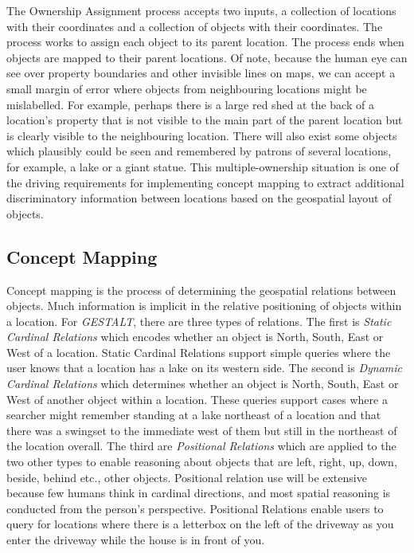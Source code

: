 The Ownership Assignment process accepts two inputs, a collection of locations with their coordinates and a collection of objects with their coordinates. 
The process works to assign each object to its parent location. 
The process ends when objects are mapped to their parent locations. Of note, because the human eye can see over property boundaries and other invisible lines on maps, we can accept a small margin of error where objects from neighbouring locations might be mislabelled. For example, perhaps there is a large red shed at the back of a location's property that is not visible to the main part of the parent location but is clearly visible to the neighbouring location.
There will also exist some objects which plausibly could be seen and remembered by patrons of several locations, for example, a lake or a giant statue. 
This multiple-ownership situation is one of the driving requirements for implementing concept mapping to extract additional discriminatory information between locations based on the geospatial layout of objects. 

\subsection{Concept Mapping}
Concept mapping is the process of determining the geospatial relations between objects. Much information is implicit in the relative positioning of objects within a location. For \textit{GESTALT}, there are three types of relations. 
The first is \textit{Static Cardinal Relations} which encodes whether an object is North, South, East or West of a location. Static Cardinal Relations support simple queries where the user knows that a location has a lake on its western side. 
The second is \textit{Dynamic Cardinal Relations} which determines whether an object is North, South, East or West of another object within a location. These queries support cases where a searcher might remember standing at a lake northeast of a location and that there was a swingset to the immediate west of them but still in the northeast of the location overall. 
The third are \textit{Positional Relations} which are applied to the two other types to enable reasoning about objects that are left, right, up, down, beside, behind etc., other objects. 
Positional relation use will be extensive because few humans think in cardinal directions, and most spatial reasoning is conducted from the person's perspective. 
Positional Relations enable users to query for locations where there is a letterbox on the left of the driveway as you enter the driveway while the house is in front of you. 

